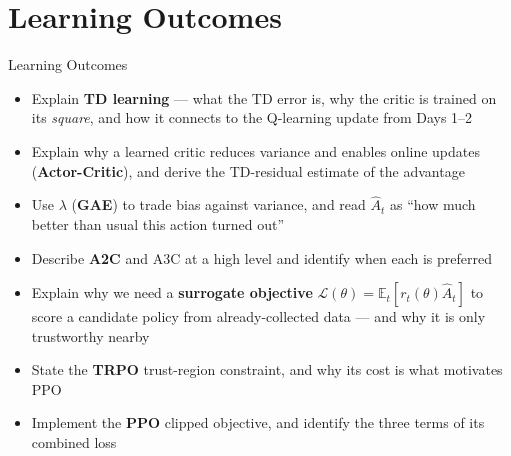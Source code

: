 \section{Learning Outcomes}
\begin{frame}{Learning Outcomes}
    \begin{itemize}
        \setlength{\itemsep}{0.55em}
        \item Explain \textbf{TD learning} --- what the TD error is, why the critic is trained on its \emph{square}, and how it connects to the Q-learning update from Days 1--2
        \item Explain why a learned critic reduces variance and enables online updates (\textbf{Actor-Critic}), and derive the TD-residual estimate of the advantage
        \item Use $\lambda$ (\textbf{GAE}) to trade bias against variance, and read $\hat{A}_t$ as ``how much better than usual this action turned out''
        \item Describe \textbf{A2C} and A3C at a high level and identify when each is preferred
        \item Explain why we need a \textbf{surrogate objective} $\mathcal{L}(\theta) = \mathbb{E}_t[r_t(\theta)\hat{A}_t]$ to score a candidate policy from already-collected data --- and why it is only trustworthy nearby
        \item State the \textbf{TRPO} trust-region constraint, and why its cost is what motivates PPO
        \item Implement the \textbf{PPO} clipped objective, and identify the three terms of its combined loss
    \end{itemize}
\end{frame}
